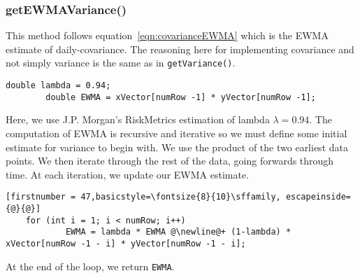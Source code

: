 \documentclass[../Dissertation.tex]{subfiles}
\begin{document}
\subsubsection{getEWMAVariance()}

This method follows equation~\ref{eqn:covarianceEWMA} which is the EWMA estimate of daily-covariance.
The reasoning here for implementing covariance and not simply variance is the same as in \lstinline|getVariance()|.
\begin{lstlisting}[firstnumber = 45]
        double lambda = 0.94;
        double EWMA = xVector[numRow -1] * yVector[numRow -1];	
\end{lstlisting}

Here, we use J.P. Morgan's RiskMetrics estimation of lambda $\lambda = 0.94$.
The computation of EWMA is recursive and iterative so we must define some initial estimate for variance to begin with.
We use the product of the two earliest data points.
We then iterate through the rest of the data, going forwards through time.
At each iteration, we update our EWMA estimate.
\begin{lstlisting}[firstnumber = 47,basicstyle=\fontsize{8}{10}\sffamily, escapeinside={@}{@}]
	for (int i = 1; i < numRow; i++)
            EWMA = lambda * EWMA @\newline@+ (1-lambda) * xVector[numRow -1 - i] * yVector[numRow -1 - i];
\end{lstlisting}
At the end of the loop, we return \lstinline|EWMA|.
\end{document}
